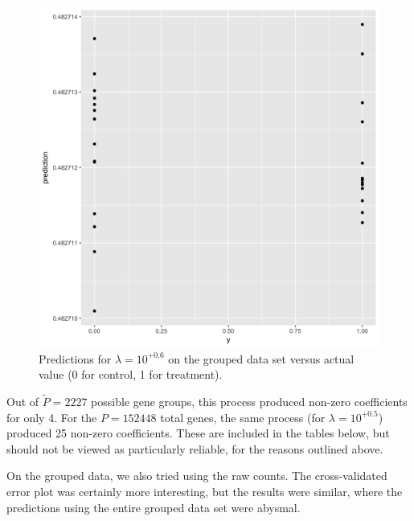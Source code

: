 \documentclass{article}
\begin{document}
\begin{figure}[h]
\begin{center}
\includegraphics[scale=0.15]{kegg-cv-prediction.png}
\caption{\label{fig:two}Predictions for $\lambda=10^{+0.6}$ on the grouped data set versus actual value (0 for control, 1 for treatment).}
\end{center}
\end{figure}

Out of $\tilde{P}=2227$ possible gene groups, this process produced non-zero coefficients for only 4. For the $P=152448$ total genes, the same process (for $\lambda=10^{+0.5}$) produced 25 non-zero coefficients. These
are included in the tables below, but should not be viewed as particularly reliable, for the reasons outlined above.

On the grouped data, we also tried using the raw counts. The cross-validated error plot was certainly more 
interesting, but the results were similar, where the predictions using the entire grouped data set were abysmal.
\end{document}
